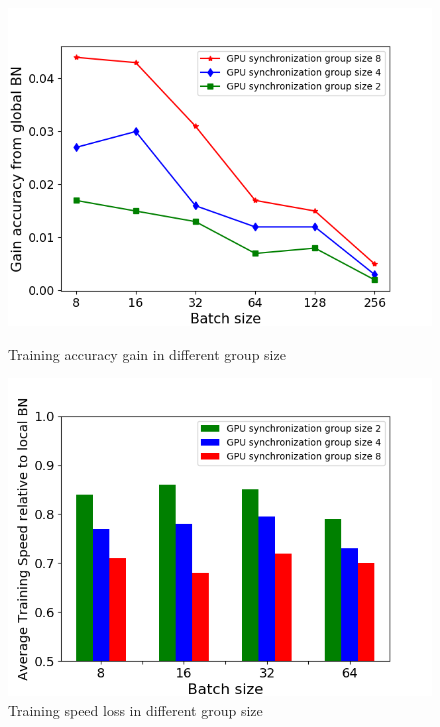 \documentclass{llncs}
\begin{document}
\begin{figure}[h]
\begin{minipage}[t]{0.45\linewidth}
\centering
\includegraphics[width=1\textwidth]{figure/cifar10-gain.png}
\caption{Training accuracy gain in different group size}
\label{fig:accVsBz}
\end{minipage}
\hfill
\begin{minipage}[t]{0.45\linewidth}
\centering
\includegraphics[width=1\textwidth]{figure/cifar10-speedloss.png}
\caption{Training speed loss in different group size}
\label{fig:speedloss}
\end{minipage}
\end{figure}
\end{document}
